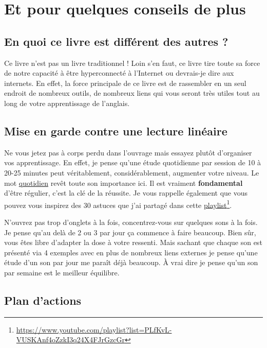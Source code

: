 \chapter{Et pour quelques conseils de plus}\label{chap:conseils}

\section{En quoi ce livre est différent des autres ?}\label{sec:diff}

Ce livre n'est pas un livre traditionnel ! Loin s'en faut, ce livre
tire toute sa force de notre capacité à être hyperconnecté à
l'Internet ou devrais-je dire aux internets. En effet, la force
principale de ce livre est de rassembler en un seul endroit de
nombreux outils, de nombreux liens qui vous seront très utiles tout au
long de votre apprentissage de l'anglais.

\section{Mise en garde contre une lecture linéaire}\label{sec:lin}

Ne vous jetez pas à corps perdu dans l'ouvrage mais essayez plutôt
d'organiser vos apprentissage. En effet, je pense qu'une étude
quotidienne par session de 10 à 20-25 minutes peut véritablement,
considérablement, augmenter votre niveau. Le mot \underline{quotidien}
revêt toute son importance ici. Il est vraiment \textbf{fondamental}
d'être régulier, c'est la clé de la réussite. Je vous rappelle
également que vous pouvez vous inspirez des 30 astuces que j'ai
partagé dans cette \href{https://www.youtube.com/playlist?list=PLfKvL-VUSKAnf4oZzkI3q24X4FJrGzcGr}{playlist}\footnote{\url{https://www.youtube.com/playlist?list=PLfKvL-VUSKAnf4oZzkI3q24X4FJrGzcGr}}.

N'ouvrez pas trop d'onglets à la fois, concentrez-vous sur quelques
sons à la fois. Je pense qu'au delà de 2 ou 3 par jour ça commence à
faire beaucoup. Bien sûr, vous êtes libre d'adapter la dose à votre
ressenti. Mais sachant que chaque son est présenté via 4 exemples avec
en plus de nombreux liens externes je pense qu'une étude d'un son par
jour me paraît déjà beaucoup. À vrai dire je pense qu'un son par
semaine est le meilleur équilibre.

\section{Plan d'actions}\label{sec:plan}

